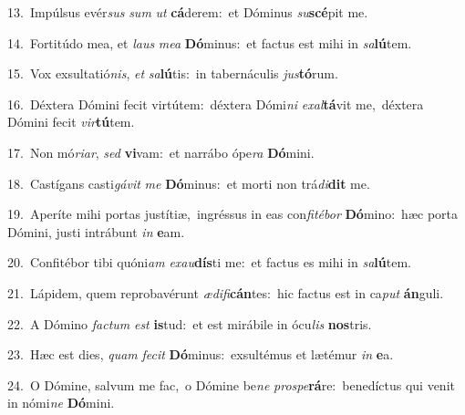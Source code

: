 {\numbfont\textcolor{\numbcolor}{13.}}~Impúlsus evér\textit{sus} \textit{sum} \textit{ut} \textbf{cá}\-derem:~\star et Dóminus \textit{su}\-\textbf{scé}pit me.\par
{\numbfont\textcolor{\numbcolor}{14.}}~Fortitúdo mea, et \textit{laus} \textit{me}\-\textit{a} \textbf{Dó}\-minus:~\star et factus est mihi in \textit{sa}\-\textbf{lú}tem.\par
{\numbfont\textcolor{\numbcolor}{15.}}~Vox exsultatió\-\textit{nis}\-, \textit{et} \textit{sa}\-\textbf{lú}tis:~\star in tabernáculis \textit{jus}\-\textbf{tó}rum.\par
{\numbfont\textcolor{\numbcolor}{16.}}~Déxtera Dómini fecit virtútem:~\dagger déxtera Dómi\textit{ni} \textit{ex}\-\textit{al}\textbf{tá}vit me,~\star déxtera Dómini fecit \textit{vir}\-\textbf{tú}tem.\par
{\numbfont\textcolor{\numbcolor}{17.}}~Non mó\-\textit{ri}\-\textit{ar}, \textit{sed} \textbf{vi}\-vam:~\star et narrábo ópe\textit{ra} \textbf{Dó}\-mini.\par
{\numbfont\textcolor{\numbcolor}{18.}}~Castígans casti\-\textit{gá}\-\textit{vit} \textit{me} \textbf{Dó}\-minus:~\star et morti non trá\-\textit{di}\-\textbf{dit} me.\par
{\numbfont\textcolor{\numbcolor}{19.}}~Aperíte mihi portas justítiæ,~\dagger ingréssus in eas con\-\textit{fi}\-\textit{té}\textit{bor} \textbf{Dó}\-mino:~\star hæc porta Dómini, justi intrábunt \textit{in} \textbf{e}\-am.\par
{\numbfont\textcolor{\numbcolor}{20.}}~Confitébor tibi quóni\textit{am} \textit{ex}\-\textit{au}\textbf{dís}ti me:~\star et factus es mihi in \textit{sa}\-\textbf{lú}tem.\par
{\numbfont\textcolor{\numbcolor}{21.}}~Lápidem, quem reprobavérunt \textit{æ}\-\textit{di}\textit{fi}\textbf{cán}tes:~\star hic factus est in ca\textit{put} \textbf{án}\-guli.\par
{\numbfont\textcolor{\numbcolor}{22.}}~A Dómino \textit{fac}\-\textit{tum} \textit{est} \textbf{is}\-tud:~\star et est mirábile in ócu\textit{lis} \textbf{nos}\-tris.\par
{\numbfont\textcolor{\numbcolor}{23.}}~Hæc est dies, \textit{quam} \textit{fe}\-\textit{cit} \textbf{Dó}\-minus:~\star exsultémus et lætémur \textit{in} \textbf{e}\-a.\par
{\numbfont\textcolor{\numbcolor}{24.}}~O Dómine, salvum me fac,~\dagger o Dómine be\textit{ne} \textit{pro}\-\textit{spe}\textbf{rá}re:~\star benedíctus qui venit in nómi\textit{ne} \textbf{Dó}\-mini.\par
